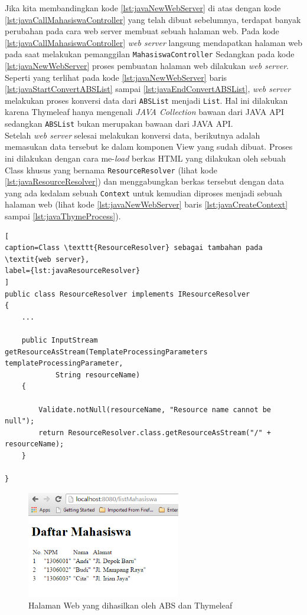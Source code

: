 Jika kita membandingkan kode \ref{lst:javaNewWebServer} di atas dengan kode \ref{lst:javaCallMahasiswaController} yang telah dibuat sebelumnya, terdapat banyak perubahan pada cara web server membuat sebuah halaman web. Pada kode \ref{lst:javaCallMahasiswaController} \textit{web server} langsung mendapatkan halaman web pada saat melakukan pemanggilan \texttt{MahasiswaController} Sedangkan pada kode \ref{lst:javaNewWebServer} proses pembuatan halaman web dilakukan \textit{web server}. Seperti yang terlihat pada kode \ref{lst:javaNewWebServer} baris \ref{lst:javaStartConvertABSList} sampai \ref{lst:javaEndConvertABSList}, \textit{web server} melakukan proses konversi data dari \texttt{ABSList} menjadi \texttt{List}. Hal ini dilakukan karena Thymeleaf hanya mengenali \textit{JAVA Collection} bawaan dari JAVA API sedangkan \texttt{ABSList} bukan merupakan bawaan dari JAVA API.\\

Setelah \textit{web server} selesai melakukan konversi data, berikutnya adalah memasukan data tersebut ke dalam komponen View yang sudah dibuat. Proses ini dilakukan dengan cara me-\textit{load} berkas HTML yang dilakukan oleh sebuah Class khusus yang bernama \texttt{ResourceResolver} (lihat kode \ref{lst:javaResourceResolver}) dan menggabungkan berkas tersebut dengan data yang ada kedalam sebuah \texttt{Context} untuk kemudian diproses menjadi sebuah halaman web (lihat kode \ref{lst:javaNewWebServer} baris \ref{lst:javaCreateContext} sampai \ref{lst:javaThymeProcess}).

\begin{lstlisting}[
caption=Class \texttt{ResourceResolver} sebagai tambahan pada \textit{web server},
label={lst:javaResourceResolver}
]
public class ResourceResolver implements IResourceResolver
{
	...
	
	public InputStream getResourceAsStream(TemplateProcessingParameters templateProcessingParameter,
			String resourceName) 
	{
		
		Validate.notNull(resourceName, "Resource name cannot be null");
		return ResourceResolver.class.getResourceAsStream("/" + resourceName);
	}

}
\end{lstlisting}

\begin{figure}
    \centering
    \includegraphics[width=0.6\textwidth]{img/hasil-list-mhs_new.png}
    \caption{Halaman Web yang dihasilkan oleh ABS dan Thymeleaf}
    \label{fig:listMhsThymeleaf}
\end{figure}

